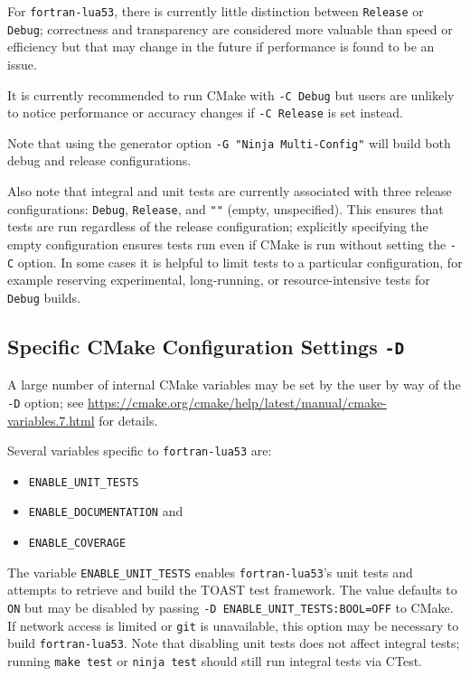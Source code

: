 For \texttt{fortran-lua53}, there is currently little distinction between
\texttt{Release} or \texttt{Debug}; correctness and transparency are
considered more valuable than speed or efficiency but that may change
in the future if performance is found to be an issue.

It is currently recommended to run CMake with \texttt{-C Debug} but
users are unlikely to notice performance or accuracy changes if
\texttt{-C Release} is set instead.

Note that using the generator option \texttt{-G "Ninja Multi-Config"}
will build both debug and release configurations.

Also note that integral and unit tests are currently associated with
three release configurations: \texttt{Debug}, \texttt{Release}, and
\texttt{""} (empty, unspecified). This ensures that tests are run
regardless of the release configuration; explicitly specifying the
empty configuration ensures tests run even if CMake is run without
setting the \texttt{-C} option. In some cases it is helpful
to limit tests to a particular configuration, for example reserving
experimental, long-running, or resource-intensive tests for
\texttt{Debug} builds.

\subsection{Specific CMake Configuration Settings \texttt{-D}}

A large number of internal CMake variables may be set by the user by
way of the \texttt{-D} option; see \url{https://cmake.org/cmake/help/latest/manual/cmake-variables.7.html}
for details.

Several variables specific to \texttt{fortran-lua53} are:

\begin{itemize}
    \item \texttt{ENABLE\_UNIT\_TESTS}
    \item \texttt{ENABLE\_DOCUMENTATION} and
    \item \texttt{ENABLE\_COVERAGE}
\end{itemize}

The variable \texttt{ENABLE\_UNIT\_TESTS} enables \texttt{fortran-lua53}'s unit tests
and attempts to retrieve and build the TOAST test framework. The value
defaults to \texttt{ON} but may be disabled by passing
\texttt{-D ENABLE\_UNIT\_TESTS:BOOL=OFF} to CMake. If network access is
limited or \texttt{git} is unavailable, this option may be necessary to
build \texttt{fortran-lua53}. Note that disabling unit tests does not affect integral
tests; running \texttt{make test} or \texttt{ninja test} should still run
integral tests via CTest.

